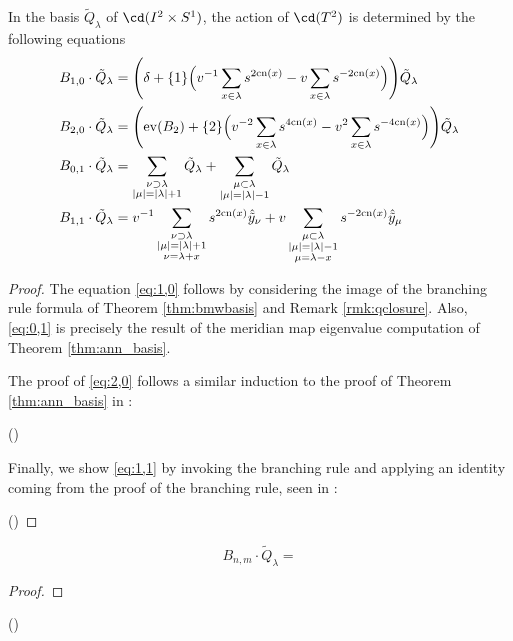 \begin{proposition} \label{prop:generatoractions}
In the basis $\tilde{Q}_\lambda$ of $\cd(I^2 \times S^1)$, the action of $\cd(T^2)$ is determined by the following equations
\begin{align}
    B_{1,0} \cdot \tilde{Q}_\lambda &= \Bigg(\delta + \{1\} \Big( v^{-1}\sum_{x\in\lambda} s^{2\mathrm{cn}(x)} - v \sum_{x\in\lambda} s^{-2\mathrm{cn}(x)} \Big) \Bigg) \tilde{Q}_\lambda \label{eq:1,0}\\
    B_{2,0} \cdot \tilde{Q}_\lambda &= \Bigg({\rm{ev}}(B_2) + \{2\} \Big( v^{-2}\sum_{x\in\lambda} s^{4\mathrm{cn}(x)} - v^2 \sum_{x\in\lambda} s^{-4\mathrm{cn}(x)} \Big) \Bigg) \tilde{Q}_\lambda \label{eq:2,0}\\
    B_{0,1} \cdot \tilde{Q}_\lambda &= \sum_{\substack{\nu \supset \lambda \\ |\mu| = |\lambda| + 1}} \tilde{Q}_\lambda + \sum_{\substack{\mu \subset \lambda \\ |\mu| = |\lambda| - 1}} \tilde{Q}_\lambda \label{eq:0,1}\\
    B_{1,1} \cdot \tilde{Q}_\lambda &= v^{-1} \sum_{\substack{\nu \supset \lambda \\ |\mu| = |\lambda| + 1 \\ \nu = \lambda + x}} s^{2\mathrm{cn}(x)} \hat{\tilde{y}}_\nu + v \sum_{\substack{\mu \subset \lambda \\ |\mu| = |\lambda| - 1 \\ \mu = \lambda - x}} s^{-2\mathrm{cn}(x)} \hat{\tilde{y}}_\mu \label{eq:1,1}
\end{align}
\end{proposition}
\begin{proof}
The equation \eqref{eq:1,0} follows by considering the image of the branching rule formula of Theorem \ref{thm:bmwbasis} and Remark \ref{rmk:qclosure}. 
Also, \eqref{eq:0,1} is precisely the result of the meridian map eigenvalue computation of Theorem \ref{thm:ann_basis}. 

The proof of \eqref{eq:2,0} follows a similar induction to the proof of Theorem \ref{thm:ann_basis} in \cite{ZL01}:

()

Finally, we show \eqref{eq:1,1} by invoking the branching rule and applying an identity coming from the proof of the branching rule, seen in \cite{BB01}:

()
\end{proof}

\begin{theorem} \label{thm:algebraaction}
\[
B_{n,m} \cdot \tilde{Q}_\lambda = 
\]
\end{theorem}
\begin{proof}

\end{proof}

()










